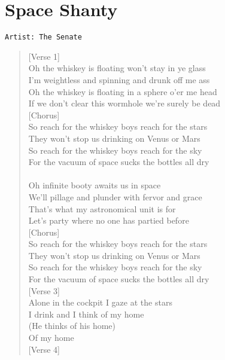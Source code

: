 \documentclass[11pt]{article}
\begin{document}
\section{Space Shanty}
\label{sec:org8a32070}
\begin{verbatim}
Artist: The Senate
\end{verbatim}
\begin{verse}
[Verse 1]\\
Oh the whiskey is floating won't stay in ye glass\\
I'm weightless and spinning and drunk off me ass\\
Oh the whiskey is floating in a sphere o'er me head\\
If we don't clear this wormhole we're surely be dead\\
\vspace*{1em}
[Chorus]\\
So reach for the whiskey boys reach for the stars\\
They won't stop us drinking on Venus or Mars\\
So reach for the whiskey boys reach for the sky\\
For the vacuum of space sucks the bottles all dry\\
[Verse 2]\\
Oh infinite booty awaits us in space\\
We'll pillage and plunder with fervor and grace\\
That's what my astronomical unit is for\\
Let's party where no one has partied before\\
\vspace*{1em}
[Chorus]\\
So reach for the whiskey boys reach for the stars\\
They won't stop us drinking on Venus or Mars\\
So reach for the whiskey boys reach for the sky\\
For the vacuum of space sucks the bottles all dry\\
\vspace*{1em}
[Verse 3]\\
Alone in the cockpit I gaze at the stars\\
I drink and I think of my home\\
(He thinks of his home)\\
Of my home\\
\vspace*{1em}
[Verse 4]\\

\end{verse}
\end{document}

